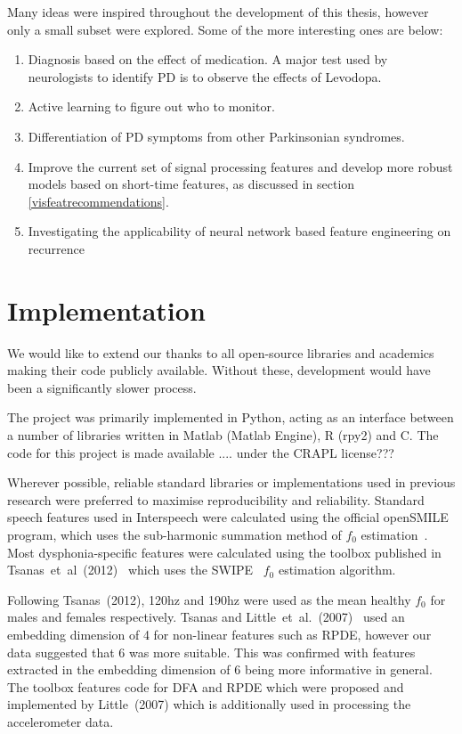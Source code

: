 \documentclass[12pt, twoside]{book}
\begin{document}
Many ideas were inspired throughout the development of this thesis, however only a small subset were explored. Some of the more interesting ones are below:


\begin{enumerate}[noitemsep, topsep=-10pt]
	\item Diagnosis based on the effect of medication. A major test used by neurologists to identify PD is to observe the effects of Levodopa.
	\item Active learning to figure out who to monitor.
	\item Differentiation of PD symptoms from other Parkinsonian syndromes.
	\item Improve the current set of signal processing features and develop more robust models based on short-time features, as discussed in section \ref{visfeatrecommendations}.
	\item Investigating the applicability of neural network based feature engineering on recurrence 
\end{enumerate}



\section{Implementation}
\label{implementation}
We would like to extend our thanks to all open-source libraries and academics making their code publicly available. Without these, development would have been a significantly slower process. 

The project was primarily implemented in Python, acting as an interface between a number of libraries written in Matlab (Matlab Engine), R (rpy2) and C. The code for this project is made available .... under the CRAPL license???

Wherever possible, reliable standard libraries or implementations used in previous research were preferred to maximise reproducibility and reliability. Standard speech features used in Interspeech were calculated using the official openSMILE~\cite{opensmile} program, which uses the sub-harmonic summation method of $f_0$ estimation~\cite{shs}. Most dysphonia-specific features were calculated using the toolbox published in Tsanas~et~al~(2012)~\cite{spoverview} which uses the SWIPE~\cite{camacho2007swipe,f0estimation} $f_0$ estimation algorithm. 

Following Tsanas~(2012), 120hz and 190hz were used as the mean healthy $f_0$ for males and females respectively. Tsanas and Little~et~al.~(2007)~\cite{splittlenonlinear2007} used an embedding dimension of 4 for non-linear features such as RPDE, however our data suggested that 6 was more suitable. This was confirmed with features extracted in the embedding dimension of 6 being more informative in general. The toolbox features code for DFA and RPDE which were proposed and implemented by Little~(2007) which is additionally used in processing the accelerometer data.
\end{document}
